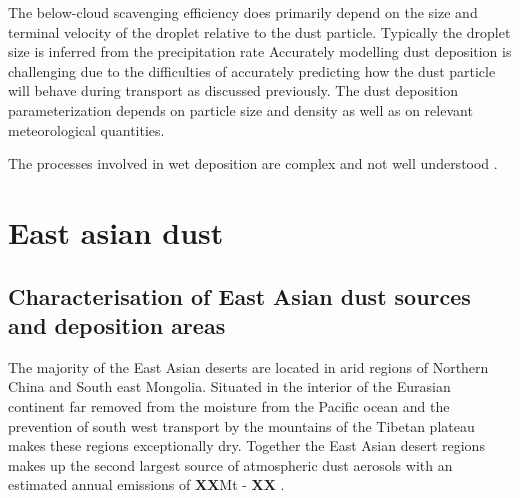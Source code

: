The below-cloud scavenging efficiency does primarily depend on the size and terminal velocity of the droplet relative to the dust particle. Typically the droplet size is inferred from the precipitation rate 
Accurately modelling dust deposition is challenging due to the difficulties of accurately predicting how the dust particle will behave during transport as discussed previously. 
The dust deposition parameterization depends on particle size and density as well
as on relevant meteorological quantities.

The processes involved in wet deposition are complex and not well understood .







\section{East asian dust}

\subsection{Characterisation of East Asian dust sources and deposition areas}
The majority of the East Asian deserts are located in arid regions of Northern China and South east Mongolia. Situated in the interior of the Eurasian continent far removed from the moisture from the Pacific ocean and the prevention of south west transport by the mountains of the Tibetan plateau makes these regions exceptionally dry.  Together the East Asian desert regions makes up the second largest source of atmospheric dust aerosols \parencite{chen2017overview} with an estimated annual emissions of \textbf{XX}Mt - \textbf{XX} . 

